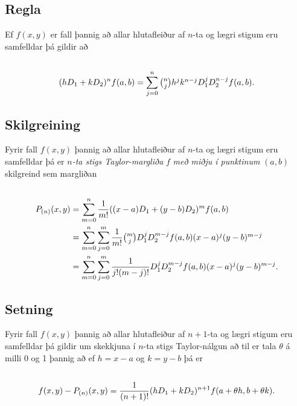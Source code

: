 \documentclass[a4paper,10pt,icelandic]{sphinxmanual}
\begin{document}
\subsection{Regla}
\label{Kafli2:regla}
Ef \(f(x,y)\) er fall þannig að allar hlutafleiður af \(n\)-ta
og lægri stigum eru samfelldar þá gildir að
\begin{gather}
\begin{split}\displaystyle\end{split}\notag\\\begin{split}(hD_1+kD_2)^nf(a,b)=\sum_{j=0}^n \textstyle{n\choose j}
h^jk^{n-j}D_1^jD_2^{n-j}f(a,b).\end{split}\notag
\end{gather}

\subsection{Skilgreining}
\label{Kafli2:id59}
Fyrir fall \(f(x,y)\) þannig að allar hlutafleiður af \(n\)-ta
og lægri stigum eru samfelldar þá er \(n\)\emph{-ta stigs
Taylor-margliða} \(f\) \emph{með miðju í punktinum} \((a,b)\)
skilgreind sem margliðan
\begin{gather}
\begin{split}\displaystyle\end{split}\notag\\\begin{split}\begin{aligned}
P_{(n)}(x,y)&= \sum_{m=0}^n \frac{1}{m!}((x-a)D_1+(y-b)D_2)^m f(a,b)\\
&=\sum_{m=0}^n\sum_{j=0}^m \frac{1}{m!}\textstyle{m\choose j}
D_1^jD_2^{m-j}f(a,b)(x-a)^j(y-b)^{m-j}\\
&=\sum_{m=0}^n\sum_{j=0}^m \frac{1}{j!(m-j)!}
D_1^jD_2^{m-j}f(a,b)(x-a)^j(y-b)^{m-j}.\end{aligned}\end{split}\notag
\end{gather}

\subsection{Setning}
\label{Kafli2:id60}
Fyrir fall \(f(x,y)\) þannig að allar hlutafleiður af \(n+1\)-ta
og lægri stigum eru samfelldar þá gildir um skekkjuna í \(n\)-ta
stigs Taylor-nálgun að til er tala \(\theta\) á milli 0 og 1 þannig
að ef \(h=x-a\) og \(k=y-b\) þá er
\begin{gather}
\begin{split}\displaystyle\end{split}\notag\\\begin{split}f(x,y)-P_{(n)}(x,y)=\frac{1}{(n+1)!}(hD_1+kD_2)^{n+1}
f(a+\theta h, b+\theta k).\end{split}\notag
\end{gather}
\end{document}
